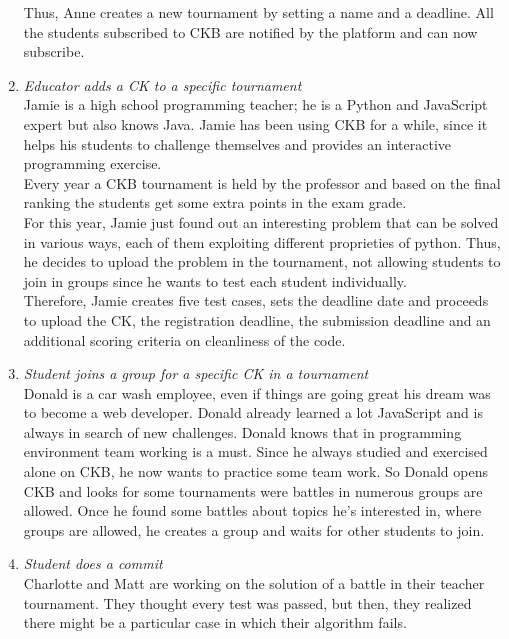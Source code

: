 \documentclass[12pt, a4paper]{report}
\begin{document}
\begin{enumerate}
            Thus, Anne creates a new tournament by setting a name and a deadline. 
            All the students subscribed to CKB are notified by the platform and can now subscribe.
        \item \textit{Educator adds a CK to a specific tournament} \\
            Jamie is a high school programming teacher; he is a Python and JavaScript expert but also knows Java.
            Jamie has been using CKB for a while, since it helps his students to challenge themselves and provides an interactive programming exercise.\\
            Every year a CKB tournament is held by the professor and based on the final ranking the students get some extra points in the exam grade.\\ 
            For this year, Jamie just found out an interesting problem that can be solved in various ways, each of them exploiting different proprieties of python.
            Thus, he decides to upload the problem in the tournament, not allowing students to join in groups since he wants to test each student individually.\\
            Therefore, Jamie creates five test cases, sets the deadline date and proceeds to upload the CK, the registration deadline, the submission deadline and an additional scoring criteria on cleanliness of the code.
        \item \textit{Student joins a group for a specific CK in a tournament}\\
            Donald is a car wash employee, even if things are going great his dream was to become a web developer.
            Donald already learned a lot JavaScript and is always in search of new challenges.
            Donald knows that in programming environment team working is a must.
            Since he always studied and exercised alone on CKB, he now wants to practice some team work.
            So Donald opens CKB and looks for some tournaments were battles in numerous groups are allowed.
            Once he found some battles about topics he's interested in, where groups are allowed, he creates a group and waits for other students to join.
        \item \textit{Student does a commit} \\
            Charlotte and Matt are working on the solution of a battle in their teacher tournament.
            They thought every test was passed, but then, they realized there might be a particular case in which their algorithm fails.

\end{enumerate}
\end{document}

